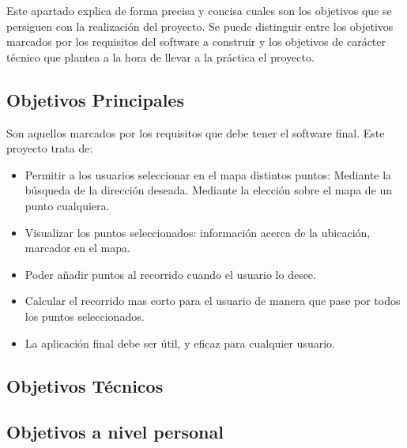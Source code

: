 
Este apartado explica de forma precisa y concisa cuales son los objetivos que se persiguen con la realización del proyecto. Se puede distinguir entre los objetivos marcados por los requisitos del software a construir y los objetivos de carácter técnico que plantea a la hora de llevar a la práctica el proyecto.

\subsection{Objetivos Principales}
Son aquellos marcados por los requisitos que debe tener el software final. Este proyecto trata de:
\begin{itemize}
	\item Permitir a los usuarios seleccionar en el mapa distintos puntos:
	\subitem Mediante la búsqueda de la dirección deseada.
	\subitem Mediante la elección sobre el mapa de un punto cualquiera.
	\item Visualizar los puntos seleccionados: información acerca de la ubicación, marcador en el mapa.
	\item Poder añadir puntos al recorrido cuando el usuario lo desee.
	\item Calcular el recorrido mas corto para el usuario de manera que pase por todos los puntos seleccionados.
	\item La aplicación final debe ser útil, y eficaz para cualquier usuario.
\end{itemize}

\subsection{Objetivos Técnicos}

\subsection{Objetivos a nivel personal}

